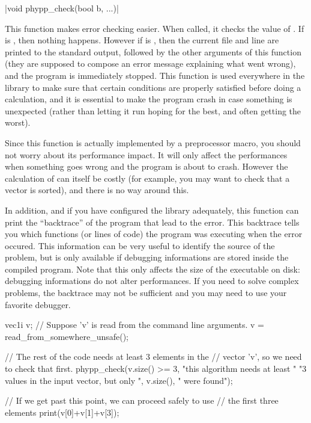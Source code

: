 \funcitem \cppinline|void phypp_check(bool b, ...)| 

This function makes error checking easier. When called, it checks the value of . If  is \cpptrue, then nothing happens. However if  is \cppfalse, then the current file and line are printed to the standard output, followed by the other arguments of this function (they are supposed to compose an error message explaining what went wrong), and the program is immediately stopped. This function is used everywhere in the \phypp library to make sure that certain conditions are properly satisfied before doing a calculation, and it is essential to make the program crash in case something is unexpected (rather than letting it run hoping for the best, and often getting the worst).

Since this function is actually implemented by a preprocessor macro, you should not worry about its performance impact. It will only affect the performances when something goes wrong and the program is about to crash. However the calculation of  can itself be costly (for example, you may want to check that a vector is sorted), and there is no way around this.

In addition, and if you have configured the \phypp library adequately, this function can print the ``backtrace'' of the program that lead to the error. This backtrace tells you which functions (or lines of code) the program was executing when the error occured. This information can be very useful to identify the source of the problem, but is only available if debugging informations are stored inside the compiled program. Note that this only affects the size of the executable on disk: debugging informations do not alter performances. If you need to solve complex problems, the backtrace may not be sufficient and you may need to use your favorite debugger.

\begin{example}
\begin{cppcode}
vec1i v;
// Suppose 'v' is read from the command line arguments.
v = read_from_somewhere_unsafe();

// The rest of the code needs at least 3 elements in the
// vector 'v', so we need to check that first.
phypp_check(v.size() >= 3, "this algorithm needs at least "
    "3 values in the input vector, but only ", v.size(),
    " were found");

// If we get past this point, we can proceed safely to use
// the first three elements
print(v[0]+v[1]+v[3]);
\end{cppcode}
\end{example}
